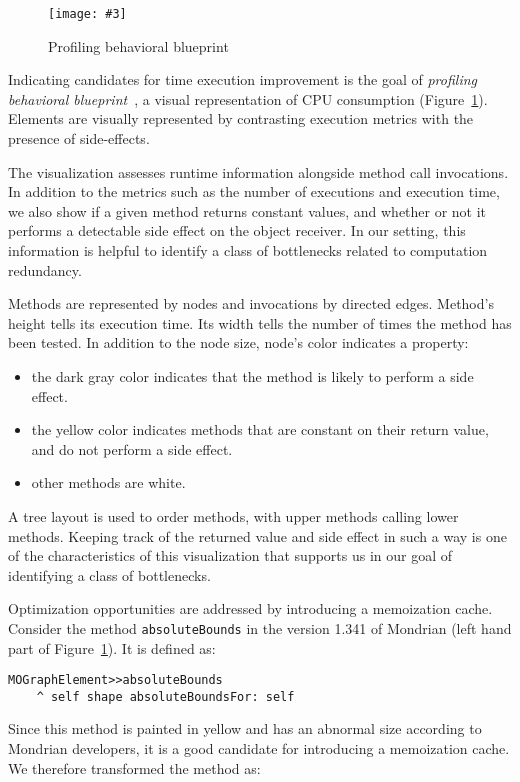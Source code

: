 \documentclass[runningheads]{llncs}
\newcommand{\ct}{\lstinline[backgroundcolor=\color{white},basicstyle=\footnotesize\ttfamily]}
\newcommand{\sd}[1]{\nb{SD}{orange}{#1}}
\newcommand{\fig}[4]{
	\begin{figure}[#1]
		\centering
		\texttt{[image: \#3]}
		\caption{\label{fig:#3}#4}
	\end{figure}}
\newcommand{\figref}[1]{Figure~\ref{fig:#1}}
\newcommand{\myparagraph}[1]{\noindent \textbf{#1.}}
\begin{document}
\fig{}{1.0}{ProfilingBlueprint}{Profiling behavioral blueprint}
Indicating candidates for time execution improvement is the goal of \emph{profiling behavioral blueprint}~\cite{Berg10c}, a visual representation of CPU consumption (\figref{ProfilingBlueprint}). Elements are visually represented by contrasting execution metrics with the presence of side-effects.
\sd{put a ref to polymetric views.}

The visualization assesses runtime information alongside method call invocations. In addition to the metrics such as the number of executions and execution time, we also show if a given method returns constant values, and whether or not it performs a detectable side effect on the object receiver. In our setting, this information is helpful to identify a class of bottlenecks related to computation redundancy.

Methods are represented by nodes and invocations by directed edges. Method's height tells its execution time. Its width tells the number of times the method has been tested. In addition to the node size, node's color indicates a property:
\begin{itemize}
\item the dark gray color indicates that the method is likely to perform a side effect. 
\item the yellow color indicates methods that are constant on their return value, and do not perform a side effect.
\item other methods are white.
\end{itemize}

A tree layout is used to order methods, with upper methods calling lower methods.
Keeping track of the returned value and side effect in such a way is one of the characteristics of this visualization that supports us in our goal of identifying a class of bottlenecks. 

Optimization opportunities are addressed by introducing a memoization cache.
Consider the method \ct{absoluteBounds} in the version 1.341 of Mondrian (left hand part of \figref{ProfilingBlueprint}). It is defined as:

\begin{lstlisting}
MOGraphElement>>absoluteBounds
	^ self shape absoluteBoundsFor: self
\end{lstlisting}

Since this method is painted in yellow and has an abnormal size according to Mondrian developers, it is a good candidate for introducing a memoization cache. We therefore transformed the method as:
\end{document}
